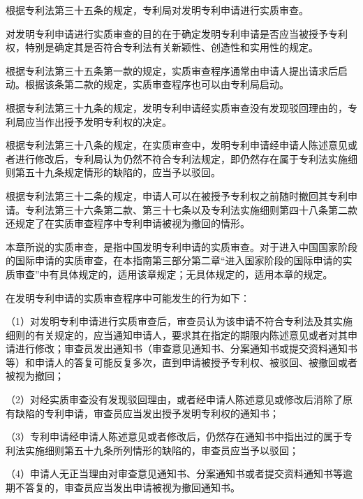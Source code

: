 根据专利法第三十五条的规定，专利局对发明专利申请进行实质审查。

对发明专利申请进行实质审查的目的在于确定发明专利申请是否应当被授予专利权，特别是确定其是否符合专利法有关新颖性、创造性和实用性的规定。

根据专利法第三十五条第一款的规定，实质审查程序通常由申请人提出请求后启动。根据该条第二款的规定，实质审查程序也可以由专利局启动。

根据专利法第三十九条的规定，发明专利申请经实质审查没有发现驳回理由的，专利局应当作出授予发明专利权的决定。

根据专利法第三十八条的规定，在实质审查中，发明专利申请经申请人陈述意见或者进行修改后，专利局认为仍然不符合专利法规定，即仍然存在属于专利法实施细则第五十九条规定情形的缺陷的，应当予以驳回。

根据专利法第三十二条的规定，申请人可以在被授予专利权之前随时撤回其专利申请。专利法第三十六条第二款、第三十七条以及专利法实施细则第四十八条第二款还规定了在实质审查程序中专利申请被视为撤回的情形。

本章所说的实质审查，是指中国发明专利申请的实质审查。对于进入中国国家阶段的国际申请的实质审查，在本指南第三部分第二章“进入国家阶段的国际申请的实质审查”中有具体规定的，适用该章规定；无具体规定的，适用本章的规定。

在发明专利申请的实质审查程序中可能发生的行为如下：

{\setlength{\parindent}{17.1bp}（1）对发明专利申请进行实质审查后，审查员认为该申请不符合专利法及其实施细则的有关规定的，应当通知申请人，要求其在指定的期限内陈述意见或者对其申请进行修改；审查员发出通知书（审查意见通知书、分案通知书或提交资料通知书等）和申请人的答复可能反复多次，直到申请被授予专利权、被驳回、被撤回或者被视为撤回；\par}

{\setlength{\parindent}{17.1bp}（2）对经实质审查没有发现驳回理由，或者经申请人陈述意见或修改后消除了原有缺陷的专利申请，审查员应当发出授予发明专利权的通知书；\par}

{\setlength{\parindent}{17.1bp}（3）专利申请经申请人陈述意见或者修改后，仍然存在通知书中指出过的属于专利法实施细则第五十九条所列情形的缺陷的，审查员应当予以驳回；\par}

{\setlength{\parindent}{17.1bp}（4）申请人无正当理由对审查意见通知书、分案通知书或者提交资料通知书等逾期不答复的，审查员应当发出申请被视为撤回通知书。\par}

